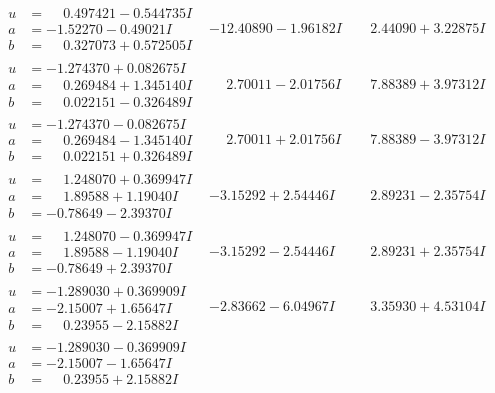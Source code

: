 \documentclass[1p]{elsarticle_modified}
\theoremstyle{definition}
\begin{document}
$$\begin{array}{c|c|c}
\begin{aligned}
u &= \phantom{-}0.497421 - 0.544735 I \\
a &= -1.52270 - 0.49021 I \\
b &= \phantom{-}0.327073 + 0.572505 I\end{aligned}
 & -12.40890 - 1.96182 I & \phantom{-}2.44090 + 3.22875 I \\ \hline\begin{aligned}
u &= -1.274370 + 0.082675 I \\
a &= \phantom{-}0.269484 + 1.345140 I \\
b &= \phantom{-}0.022151 - 0.326489 I\end{aligned}
 & \phantom{-}2.70011 - 2.01756 I & \phantom{-}7.88389 + 3.97312 I \\ \hline\begin{aligned}
u &= -1.274370 - 0.082675 I \\
a &= \phantom{-}0.269484 - 1.345140 I \\
b &= \phantom{-}0.022151 + 0.326489 I\end{aligned}
 & \phantom{-}2.70011 + 2.01756 I & \phantom{-}7.88389 - 3.97312 I \\ \hline\begin{aligned}
u &= \phantom{-}1.248070 + 0.369947 I \\
a &= \phantom{-}1.89588 + 1.19040 I \\
b &= -0.78649 - 2.39370 I\end{aligned}
 & -3.15292 + 2.54446 I & \phantom{-}2.89231 - 2.35754 I \\ \hline\begin{aligned}
u &= \phantom{-}1.248070 - 0.369947 I \\
a &= \phantom{-}1.89588 - 1.19040 I \\
b &= -0.78649 + 2.39370 I\end{aligned}
 & -3.15292 - 2.54446 I & \phantom{-}2.89231 + 2.35754 I \\ \hline\begin{aligned}
u &= -1.289030 + 0.369909 I \\
a &= -2.15007 + 1.65647 I \\
b &= \phantom{-}0.23955 - 2.15882 I\end{aligned}
 & -2.83662 - 6.04967 I & \phantom{-}3.35930 + 4.53104 I \\ \hline\begin{aligned}
u &= -1.289030 - 0.369909 I \\
a &= -2.15007 - 1.65647 I \\
b &= \phantom{-}0.23955 + 2.15882 I\end{aligned}

\end{array}$$
\end{document}

